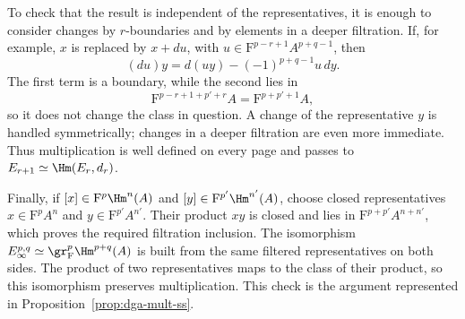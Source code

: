 To check that the result is independent of the representatives, it is
enough to consider changes by $r$-boundaries and by elements in a deeper
filtration. If, for example, $x$ is replaced by $x+du$, with
$u\in\mathrm{F}^{p-r+1}A^{p+q-1}$, then
\[
	(du)y=d(uy)-(-1)^{p+q-1}u\,dy.
\]
The first term is a boundary, while the second lies in
\[
	\mathrm{F}^{p-r+1+p'+r}A
	=\mathrm{F}^{p+p'+1}A,
\]
so it does not change the class in question. A change of the representative
$y$ is handled symmetrically; changes in a deeper filtration are even more
immediate. Thus multiplication is well defined on every page and passes to
$E_{r+1}\simeq\Hm(E_r,d_r)$.

Finally, if $[x]\in\mathrm{F}^p\Hm^n(A)$ and
$[y]\in\mathrm{F}^{p'}\Hm^{n'}(A)$, choose closed representatives
$x\in\mathrm{F}^pA^n$ and $y\in\mathrm{F}^{p'}A^{n'}$. Their product
$xy$ is closed and lies in $\mathrm{F}^{p+p'}A^{n+n'}$, which proves the
required filtration inclusion. The isomorphism
$E_\infty^{p,q}\simeq\gr^p_{\mathrm F}\Hm^{p+q}(A)$ is built from the
same filtered representatives on both sides. The product of two
representatives maps to the class of their product, so this isomorphism
preserves multiplication. This check is the argument represented in
Proposition~\ref{prop:dga-mult-ss}.
